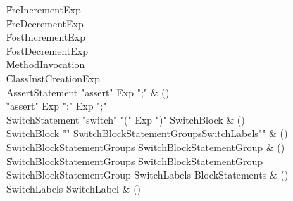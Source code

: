 \begin{bbgrammar}
    \| PreIncrementExp\\
    \| PreDecrementExp\\
    \| PostIncrementExp\\
    \| PostDecrementExp\\
    \| MethodInvocation\\
    \| ClassInstCreationExp\\
 AssertStatement  \label{prod:AssertStatement}  \: \xcd"assert" Exp \xcd";" & ()\\
    \| \xcd"assert" Exp  \xcd":" Exp  \xcd";"\\
 SwitchStatement  \label{prod:SwitchStatement}  \: \xcd"switch" \xcd"(" Exp \xcd")" SwitchBlock & ()\\
 SwitchBlock  \label{prod:SwitchBlock}  \: \xcd"{" SwitchBlockStatementGroups\opt SwitchLabels\opt \xcd"}" & ()\\
 SwitchBlockStatementGroups  \label{prod:SwitchBlockStatementGroups}  \: SwitchBlockStatementGroup & ()\\
    \| SwitchBlockStatementGroups SwitchBlockStatementGroup\\
 SwitchBlockStatementGroup  \label{prod:SwitchBlockStatementGroup}  \: SwitchLabels BlockStatements & ()\\
 SwitchLabels  \label{prod:SwitchLabels}  \: SwitchLabel & ()\\
\end{bbgrammar}

